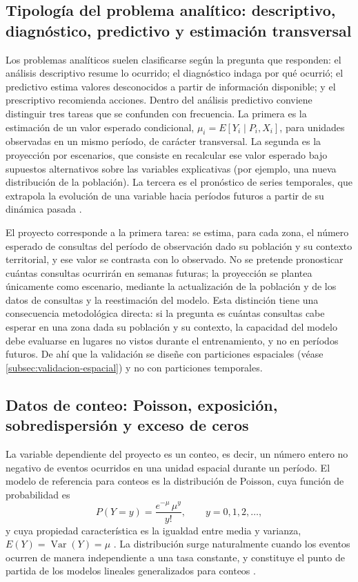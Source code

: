 \subsection{Tipología del problema analítico: descriptivo, diagnóstico, predictivo y estimación transversal}
\label{subsec:tipologia-problema}

Los problemas analíticos suelen clasificarse según la pregunta que responden: el análisis
descriptivo resume lo ocurrido; el diagnóstico indaga por qué ocurrió; el predictivo estima
valores desconocidos a partir de información disponible; y el prescriptivo recomienda
acciones. Dentro del análisis predictivo conviene distinguir tres tareas que se confunden con
frecuencia. La primera es la estimación de un valor esperado condicional,
$\mu_i = E[Y_i \mid P_i, X_i]$, para unidades observadas en un mismo período, de carácter
transversal. La segunda es la proyección por escenarios, que consiste en recalcular ese valor
esperado bajo supuestos alternativos sobre las variables explicativas (por ejemplo, una nueva
distribución de la población). La tercera es el pronóstico de series temporales, que
extrapola la evolución de una variable hacia períodos futuros a partir de su dinámica pasada
\parencite{hyndman2021}.

El proyecto corresponde a la primera tarea: se estima, para cada zona, el número esperado de
consultas del período de observación dado su población y su contexto territorial, y ese
valor se contrasta con lo observado. No se pretende pronosticar cuántas consultas ocurrirán
en semanas futuras; la proyección se plantea únicamente como escenario, mediante la
actualización de la población y de los datos de consultas y la reestimación del modelo. Esta
distinción tiene una consecuencia metodológica directa: si la pregunta es cuántas consultas
cabe esperar en una zona dada su población y su contexto, la capacidad del modelo debe
evaluarse en lugares no vistos durante el entrenamiento, y no en períodos futuros. De ahí
que la validación se diseñe con particiones espaciales (véase \ref{subsec:validacion-espacial})
y no con particiones temporales.

\subsection{Datos de conteo: Poisson, exposición, sobredispersión y exceso de ceros}
\label{subsec:datos-conteo}

La variable dependiente del proyecto es un conteo, es decir, un número entero no negativo de
eventos ocurridos en una unidad espacial durante un período. El modelo de referencia para
conteos es la distribución de Poisson, cuya función de probabilidad es
\[
  P(Y = y) = \frac{e^{-\mu}\,\mu^{y}}{y!}, \qquad y = 0, 1, 2, \ldots,
\]
y cuya propiedad característica es la igualdad entre media y varianza,
$E(Y) = \operatorname{Var}(Y) = \mu$ \parencite{cameron2013}. La distribución surge
naturalmente cuando los eventos ocurren de manera independiente a una tasa constante, y
constituye el punto de partida de los modelos lineales generalizados para conteos
\parencite{mccullagh1989,agresti2015}.


